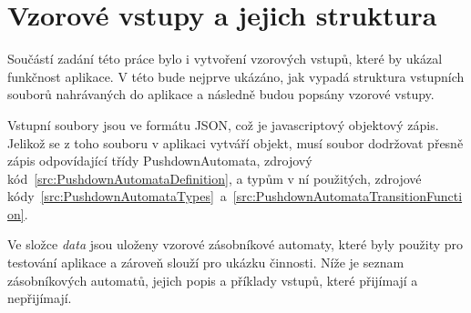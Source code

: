 \chapter{Vzorové vstupy a jejich struktura}\label{chap:Inputs}

Součástí zadání této práce bylo i vytvoření vzorových vstupů, které by ukázal funkčnost aplikace. V této bude nejprve ukázáno, jak vypadá struktura vstupních souborů nahrávaných do aplikace a následně budou popsány vzorové vstupy.

Vstupní soubory jsou ve formátu JSON, což je javascriptový objektový zápis. Jelikož se z toho souboru v aplikaci vytváří objekt, musí soubor dodržovat přesně zápis odpovídající třídy PushdownAutomata, zdrojový kód~\ref{src:PushdownAutomataDefinition}, a typům v ní použitých, zdrojové kódy~\ref{src:PushdownAutomataTypes}~a~\ref{src:PushdownAutomataTransitionFunction}.

Ve složce \textit{data} jsou uloženy vzorové zásobníkové automaty, které byly použity pro testování aplikace a zároveň slouží pro ukázku činnosti. Níže je seznam zásobníkových automatů, jejich popis a příklady vstupů, které přijímají a nepřijímají.

